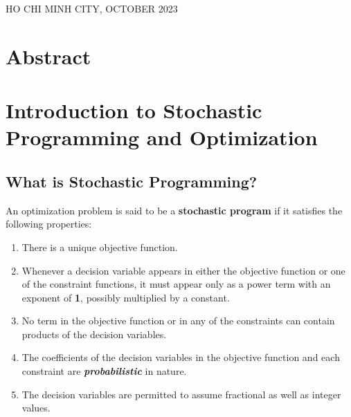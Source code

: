 \documentclass[a4paper]{article}
\begin{document}
\begin{titlepage}

\vspace*{1cm}

\begin{center}
{\footnotesize HO CHI MINH CITY, OCTOBER 2023}
\end{center}
\end{titlepage}


\newpage
\tableofcontents
\newpage


\section{Abstract}
	


\section{Introduction to Stochastic Programming and Optimization}
	\subsection{What is Stochastic Programming?}
	An optimization problem is said to be a \textbf{stochastic program} if it satisfies the following
properties:

\begin{enumerate}
	\item There is a unique objective function.
	\item Whenever a decision variable appears in either the objective function or one of the constraint functions, it must appear only as a power term with an exponent of \textbf{1}, possibly multiplied by a constant.
	\item No term in the objective function or in any of the constraints can contain products of the
	decision variables.
	\item The coefficients of the decision variables in the objective function and each constraint
	are \textit{\textbf{probabilistic}}  in nature.
	\item The decision variables are permitted to assume fractional as well as integer values.

\end{enumerate}
\end{document}
